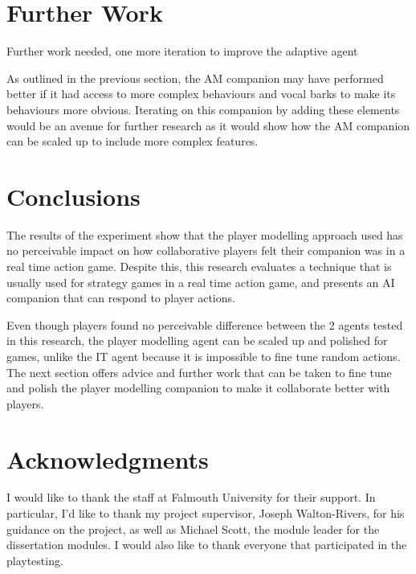 \documentclass{IEEEtran}
\begin{document}
\section{Further Work}
\label{Further Work}

Further work needed, one more iteration to improve the adaptive agent

As outlined in the previous section, the AM companion may have performed better if it had access to more complex behaviours and vocal barks to make its behaviours more obvious. Iterating on this companion by adding these elements would be an avenue for further research as it would show how the AM companion can be scaled up to include more complex features.

\section{Conclusions}
\label{Conclusions}

The results of the experiment show that the player modelling approach used has no perceivable impact on how collaborative players felt their companion was in a real time action game. Despite this, this research evaluates a technique that is usually used for strategy games in a real time action game, and presents an AI companion that can respond to player actions.

Even though players found no perceivable difference between the 2 agents tested in this research, the player modelling agent can be scaled up and polished for games, unlike the IT agent because it is impossible to fine tune random actions. The next section offers advice and further work that can be taken to fine tune and polish the player modelling companion to make it collaborate better with players.

\section*{Acknowledgments}

I would like to thank the staff at Falmouth University for their support. In particular, I'd like to thank my project supervisor, Joseph Walton-Rivers, for his guidance on the project, as well as Michael Scott, the module leader for the dissertation modules. I would also like to thank everyone that participated in the playtesting.



 
\end{document}
